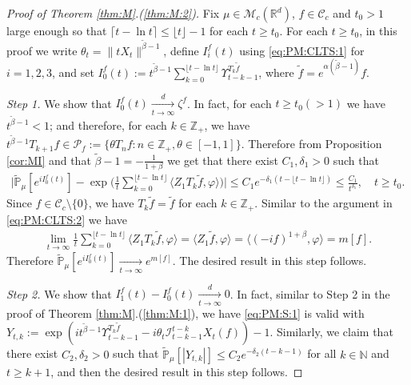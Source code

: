 \documentclass[12pt,a4paper]{amsart}
\theoremstyle{plain}
\theoremstyle{definition}
\numberwithin{equation}{section}
\begin{document}
\begin{proof}[Proof of Theorem \ref{thm:M}.(\ref{thm:M:2})]
  Fix $\mu\in \mathcal M_c(\mathbb R^d)$, $f\in \mathcal C_c$ and $t_0 > 1$ large enough so that $ \lceil t - \ln t\rceil \leq \lfloor t \rfloor - 1$ for each $t\geq t_0$.
  For each $t\geq t_0$, in this proof we write $\theta_t = \|t X_t\|^{\tilde \beta - 1}$,  define $I_i^f(t)$ using \eqref{eq:PM:CLTS:1}  for $i = 1,2,3$, and set $ I^f_0(t) := t^{\tilde \beta - 1}\sum_{k=0}^{\lfloor t-\ln t \rfloor} \Upsilon_{t-k-1}^{T_{k} \tilde f}$, where $\tilde f = e^{\alpha(\tilde \beta - 1)} f$.

  \emph{Step 1.} We show that $I^f_0(t) \xrightarrow[t\to \infty]{d} \zeta^f$.
  In fact, for each $t \geq  t_0( > 1)$ we have $t^{\tilde \beta - 1} < 1$; and therefore, for each $k \in \mathbb Z_+$, we have $t^{\tilde \beta - 1} T_{k+1} f \in \mathcal P_f:=\{\theta T_n f: n \in \mathbb Z_+, \theta \in [-1,1]\}$.
  Therefore from Proposition \ref{cor:MI} and that $\tilde \beta - 1 = -\frac{1}{1+\beta}$ we get that there exist $C_1,\delta_1 > 0$ such that
  \begin{align}
    \Big|\mathbb{\widetilde{P}}_{\mu} [e^{i I^f_0(t)} ]-\exp\Big(\frac{1}{t}\sum_{k=0}^{\lfloor t-\ln t \rfloor} \langle Z_1T_{k}\tilde f, \varphi\rangle \Big)\Big|
    \leq C_1 e^{-\delta_1(t - \lfloor t - \ln t\rfloor)}
    \leq \frac{C_1}{t^{\delta_1}},
    \quad t\geq t_0.
  \end{align}
  Since $f \in \mathcal C_c\setminus \{0\}$, we have $T_k \tilde f = \tilde f$ for each $k \in \mathbb Z_+$.
  Similar to the argument in \eqref{eq:PM:CLTS:2} we have
  \begin{align}
    \label{CLT:C:eq:m}
    \lim_{t\to \infty} \frac{1}{t}\sum_{k=0}^{\lfloor t-\ln t \rfloor} \langle Z_1 T_{k}\tilde f, \varphi\rangle
    = \langle Z_1 \tilde f,\varphi \rangle
    = \langle (-if)^{1+\beta}, \varphi \rangle
    = m[f].
  \end{align}
  Therefore $\mathbb {\widetilde P}_\mu[e^{i I^f_0(t)}] \xrightarrow[t\to \infty]{} e^{m[f]}$.
  The desired result in this step follows.

  \emph{Step 2.} We show that $ I^f_1(t) - I^f_0 (t) \xrightarrow[t\to \infty]{d} 0$.
  In fact, similar to Step 2 in the proof of Theorem \ref{thm:M}.(\ref{thm:M:1}), we  have \eqref{eq:PM:S:1} is valid with $ Y_{t,k} := \exp(i t^{\tilde \beta - 1} \Upsilon_{t-k-1}^{T_{k}\tilde f} - i\theta_t \mathcal I_{t-k-1}^{t-k} X_t(f)) - 1$.
  Similarly, we claim that there exist $C_2, \delta_2>0$ such that $\widetilde {\mathbb P}_\mu [|Y_{t,k}|] \leq C_2 e^{-\delta_2 (t-k-1)}$ for all $k\in \mathbb N$ and $t\geq k+1$, and  then the desired result in this step follows.


\end{proof}
\end{document}
